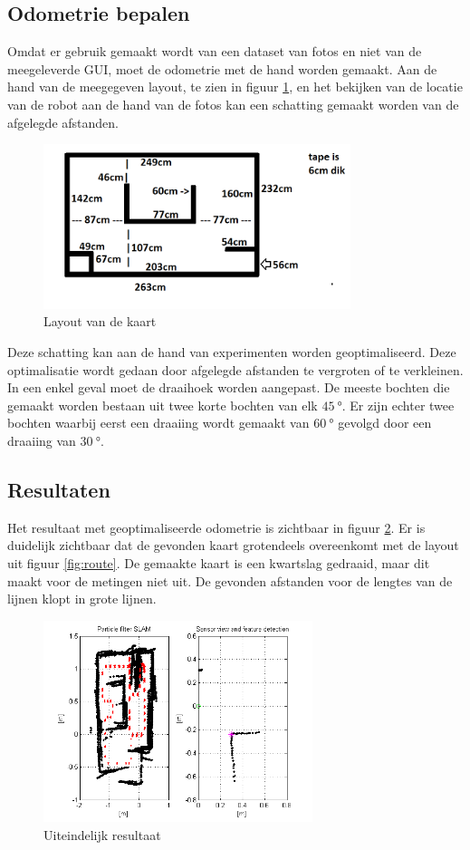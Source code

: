 \documentclass[a4paper]{article}
\begin{document}
\subsection{Odometrie bepalen}
Omdat er gebruik gemaakt wordt van een dataset van fotos en niet van de meegeleverde GUI, moet de odometrie met de hand worden gemaakt. Aan de hand van de meegegeven layout, te zien in figuur \ref{fig:layout}, en het bekijken van de locatie van de robot aan de hand van de fotos kan een schatting gemaakt worden van de afgelegde afstanden.
\begin{figure}[h]
	\centering
	\includegraphics[width=0.8\textwidth]{matlab/imgs/layout.png}
	\caption{Layout van de kaart}
	\label{fig:layout}
\end{figure}
Deze schatting kan aan de hand van experimenten worden geoptimaliseerd. Deze optimalisatie wordt gedaan door afgelegde afstanden te vergroten of te verkleinen. In een enkel geval moet de draaihoek worden aangepast. De meeste bochten die gemaakt worden bestaan uit twee korte bochten van elk $\SI{45}{\degree}$. Er zijn echter twee bochten waarbij eerst een draaiing wordt gemaakt van $\SI{60}{\degree}$ gevolgd door een draaiing van $\SI{30}{\degree}$.
\subsection{Resultaten}
Het resultaat met geoptimaliseerde odometrie is zichtbaar in figuur \ref{fig:final}. Er is duidelijk zichtbaar dat de gevonden kaart grotendeels overeenkomt met de layout uit figuur \ref{fig:route}. De gemaakte kaart is een kwartslag gedraaid, maar dit maakt voor de metingen niet uit. De gevonden afstanden voor de lengtes van de lijnen klopt in grote lijnen. 
\begin{figure}[h]
	\centering
	\includegraphics[width=0.7\textwidth]{img/statusnow.png}
	\caption{Uiteindelijk resultaat}
	\label{fig:final}
\end{figure}
\end{document}
